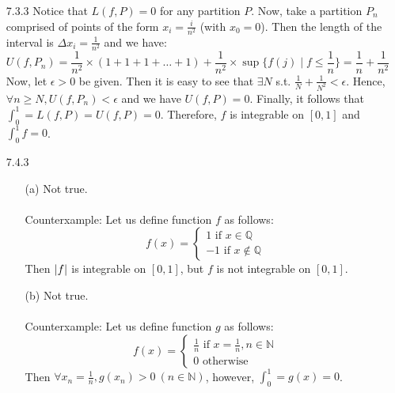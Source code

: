 \documentclass[11pt]{article}
\DeclarePairedDelimiter\abs{\lvert}{\rvert}%
\newcommand{\nats}{\mathbb{N}}
\newcommand{\rats}{\mathbb{Q}}
\begin{document}
\begin{itemize}
    \item[7.3.3]
        Notice that $L(f, P) = 0$ for any partition $P$. Now, take a partition
        $P_n$ comprised of points of the form $x_i = \frac{i}{n^2}$ (with $x_0
        = 0$). Then the length of the interval is $\Delta x_i = \frac{1}{n^2}$
        and we have:
        \begin{equation*}
            U(f, P_n) = \frac{1}{n^2} \times (1 + 1 + 1 + \dots + 1) +
                            \frac{1}{n^2} \times \sup \{f(j) \mid f
                                \leq \frac{1}{n}\}
                      = \frac{1}{n} + \frac{1}{n^2}
        \end{equation*}
        Now, let $\epsilon > 0$ be given. Then it is easy to see that $\exists
        N$ s.t. $\frac{1}{N} + \frac{1}{N^2} < \epsilon$. Hence, $\forall n
        \geq N, U(f, P_n) < \epsilon$ and we have $U(f, P) = 0$. Finally, it
        follows that $\int_0^1 = L(f, P) = U(f, P) = 0$. Therefore, $f$ is
        integrable on $[0, 1]$ and $\int_0^1 f = 0$.

    \item[7.4.3]
        \begin{itemize}
            \item[(a)]
                Not true.
                \\
                \\
                Counterxample: Let us define function $f$ as follows:
                \begin{equation*}
                    f(x) =
                    \begin{cases}
                        1 \text{ if } x \in \rats\\
                        -1 \text{ if } x \notin \rats
                    \end{cases}
                \end{equation*}
                Then $\abs{f}$ is integrable on $[0, 1]$, but $f$ is not
                integrable on $[0, 1]$.

            \item[(b)]
                Not true.
                \\
                \\
                Counterxample: Let us define function $g$ as follows:
                \begin{equation*}
                    f(x) =
                    \begin{cases}
                        \frac{1}{n} \text{ if } x = \frac{1}{n}, n \in \nats\\
                        0 \text{ otherwise}
                    \end{cases}
                \end{equation*}
                Then $\forall x_n = \frac{1}{n}, g(x_n) > 0 \ (n \in \nats)$,
                however, $\int_0^1 = g(x) = 0$.


\end{itemize}
\end{itemize}
\end{document}
